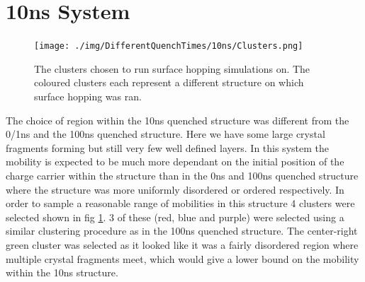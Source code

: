 \section{10ns System}
\begin{figure}
	\texttt{[image: ./img/DifferentQuenchTimes/10ns/Clusters.png]}
	\caption{\label{fig:10nsClusters}The clusters chosen to run surface hopping simulations on. The coloured clusters each represent a different structure on which surface hopping was ran.}
\end{figure}
The choice of region within the 10ns quenched structure was different from the 0/1ns and the 100ns quenched structure. Here we have some large crystal fragments forming but still very few well defined layers. In this system the mobility is expected to be much more dependant on the initial position of the charge carrier within the structure than in the 0ns and 100ns quenched structure where the structure was more uniformly disordered or ordered respectively. In order to sample a reasonable range of mobilities in this structure 4 clusters were selected shown in fig \ref{fig:10nsClusters}. 3 of these (red, blue and purple) were selected using a similar clustering procedure as in the 100ns quenched structure. The center-right green cluster was selected as it looked like it was a fairly disordered region where multiple crystal fragments meet, which would give a lower bound on the mobility within the 10ns structure.

